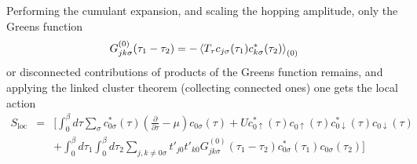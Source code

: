 \documentclass[a4paper]{article}
\begin{document}
Performing the cumulant expansion, and scaling the hopping amplitude, only the 
Greens function
\begin{equation}
    G_{jk\sigma}^{(0)} (\tau_1 - \tau_2) =
        -\braket{T_\tau c_{j\sigma}(\tau_1) c_{k\sigma}^*(\tau_2)}_{(0)}
\end{equation}
or disconnected contributions of products of the Greens function remains, and 
applying the linked cluster theorem (collecting connected ones) one gets the
local action
\begin{eqnarray}
    S_{\text{loc}} &=&
        \Bigg[
            \int_{0}^{\beta} d\tau
                \sum_{\sigma} c^{*}_{0\sigma}(\tau)
                \left(\frac{\partial}{\partial\tau} - \mu \right)
                c_{0\sigma}(\tau)
               +Uc^{*}_{0\uparrow}(\tau)c_{0\uparrow}(\tau)
                c^{*}_{0\downarrow}(\tau)c_{0\downarrow}(\tau) \\
         && +\int_{0}^{\beta} d\tau_1 \int_{0}^{\beta} d\tau_2
                \sum_{j,k \neq 0 \sigma}
                t'_{j0} t'_{k0} G_{jk\sigma}^{(0)} (\tau_1 - \tau_2)
                c^{*}_{0\sigma}(\tau_1) c_{0\sigma}(\tau_2)
         \Bigg]
\end{eqnarray}
\end{document}
